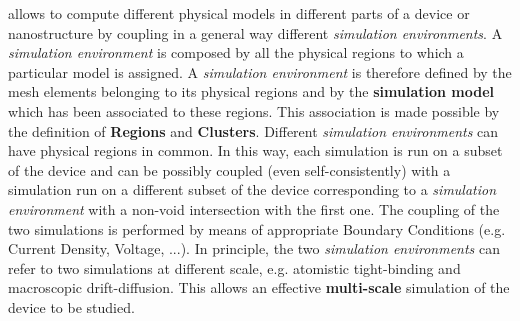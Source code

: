 \TiberCAD{} allows  to  compute  different  physical models in  different parts of  a  device or  nanostructure by  coupling in a general way different  \textit{simulation  environments}.
 A \textit{simulation  environment} is  composed  by  all  the  physical regions to  which  a  particular model  is  assigned.
A \textit{simulation  environment} is  therefore  defined by  the  mesh  elements belonging to its physical regions and  by  the  \textbf{simulation model} which has  been  associated to  these  regions.
This  association is  made possible  by  the  definition of  \TiberCAD{} \textbf{Regions} and  \textbf{Clusters}.
Different   \textit{simulation  environments} can  have  physical regions  in  common.
In this  way,  each  simulation  is  run  on  a  subset  of  the  device  and  can  be possibly  coupled  (even self-consistently)   with  a simulation  run on  a  different subset  of  the  device corresponding to a \textit{simulation  environment} with a  non-void  intersection with  the  first  one.  The  coupling  of  the  two  simulations is  performed 
 by  means  of  appropriate  Boundary  Conditions (e.g. Current Density, Voltage, ...).
 In  principle, the  two \textit{simulation  environments}  can    refer to  two simulations at  different scale, e.g. atomistic  tight-binding  and  macroscopic drift-diffusion. This  allows an effective  \textbf{multi-scale} simulation of the  device to be  studied.














